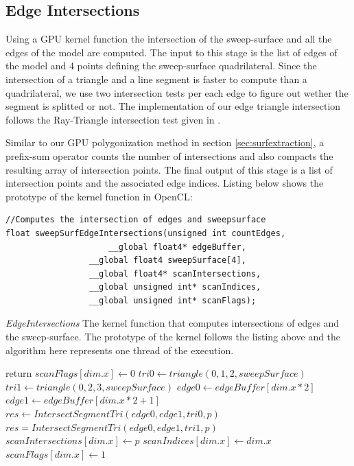 \subsection{Edge Intersections}
Using a GPU kernel function the intersection of the sweep-surface and all the edges of the model are computed. 
The input to this stage is the list of edges of the model and 4 points defining the sweep-surface quadrilateral. 
Since the intersection of a triangle and a line segment is faster to compute than a quadrilateral, we 
use two intersection tests per each edge to figure out wether the segment is splitted or not. The implementation
of our edge triangle intersection follows the Ray-Triangle intersection test given in \cite{RTR3}.


Similar to our GPU polygonization method in section \ref{sec:surfextraction}, a prefix-sum operator counts the number
of intersections and also compacts the resulting array of intersection points. The final output of this stage is a list
of intersection points and the associated edge indices. Listing below shows the prototype of the kernel function in 
OpenCL:

\begin{lstlisting}[frame=single]
//Computes the intersection of edges and sweepsurface
float sweepSurfEdgeIntersections(unsigned int countEdges,
			         __global float4* edgeBuffer,
				 __global float4 sweepSurface[4],
				 __global float4* scanIntersections,
				 __global unsigned int* scanIndices,
				 __global unsigned int* scanFlags);
\end{lstlisting}
		     
\begin{algorithm}[H]
\caption{\textit{EdgeIntersections} The kernel function that computes intersections of edges 
and the sweep-surface. The prototype of the kernel follows the listing above and the algorithm here represents one 
thread of the execution. }
\label{alg:edgeIntersections}
\begin{algorithmic}[1]	
  \STATE return
  \ENDIF
  \STATE $scanFlags[dim.x] \gets 0$
  \STATE $tri0 \gets triangle(0, 1, 2, sweepSurface)$
  \STATE $tri1 \gets triangle(0, 2, 3, sweepSurface)$
  \STATE $edge0 \gets edgeBuffer[dim.x * 2]$
  \STATE $edge1 \gets edgeBuffer[dim.x * 2 + 1]$
  \STATE $res \gets IntersectSegmentTri(edge0, edge1, tri0, p)$
  \STATE $res = IntersectSegmentTri(edge0, edge1, tri1, p)$
  \ENDIF
  \STATE $scanIntersections[dim.x] \gets p$
  \STATE $scanIndices[dim.x] \gets dim.x$
  \STATE $scanFlags[dim.x] \gets 1$
  \ENDIF
  
\end{algorithmic}
\end{algorithm}

